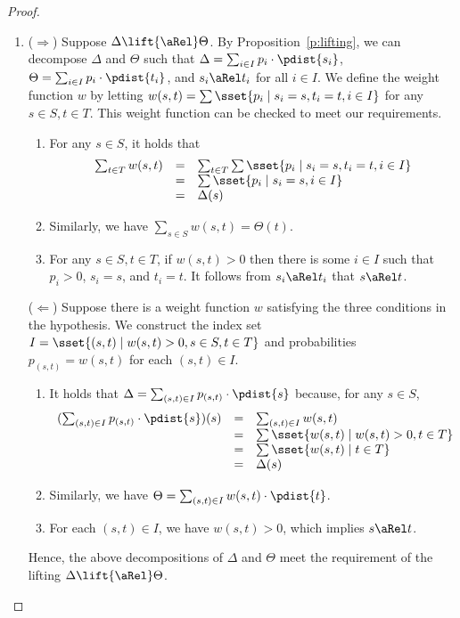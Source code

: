 \documentclass{article}
\begin{document}
\begin{proof}
\begin{enumerate}
\item
($\Rightarrow$) Suppose $\Delta\lift{\aRel}\Theta$. By
Proposition~\ref{p:lifting}, we can decompose $\Delta$ and $\Theta$
such that $\Delta=\sum_{i\in I}p_i\cdot\pdist{s_i}$,
$\Theta=\sum_{i\in I}p_i\cdot\pdist{t_i}$, and $s_i\aRel t_i$ for
all $i\in I$. We define the weight function $w$ by letting
$w(s,t)=\sum\sset{p_i\mid s_i=s, t_i=t, i\in I}$ for any $s\in S,
t\in T$. This weight function can be checked to meet our
requirements.
\begin{enumerate}
\item For any $s\in S$, it holds that
\[\begin{array}{rcl}
\sum_{t\in T}w(s,t) &= & \sum_{t\in T}\sum\sset{p_i\mid s_i=s,
t_i=t, i\in I}\\
& = &\sum\sset{p_i\mid s_i=s, i\in I}\\
& = & \Delta(s)
\end{array}\]
\item Similarly, we have $\sum_{s\in S}w(s,t)=\Theta(t)$.
\item For any $s\in S, t\in T$, if $w(s,t)>0$ then there is some $i\in
I$ such that $p_i>0$, $s_i=s$, and $t_i=t$. It follows from
$s_i\aRel t_i$ that $s\aRel t$.
\end{enumerate}

($\Leftarrow$) Suppose there is a weight function $w$ satisfying the
three conditions in the hypothesis. We construct the index set
$I=\sset{(s,t)\mid w(s,t)>0, s\in S,t\in T}$ and probabilities
$p_{(s,t)}=w(s,t)$ for each $(s,t)\in I$.
\begin{enumerate}
\item It holds that $\Delta=\sum_{(s,t)\in I}p_{(s,t)}\cdot\pdist{s}$
because, for any $s\in S$,
\[\begin{array}{rcl}
(\sum_{(s,t)\in I}p_{(s,t)}\cdot\pdist{s})(s) & = & \sum_{(s,t)\in
I}w(s,t)\\
& = & \sum\sset{w(s,t)\mid w(s,t)>0, t\in T}\\
& = & \sum\sset{w(s,t)\mid t\in T}\\
& = & \Delta(s)
\end{array}\]
\item Similarly, we have $\Theta=\sum_{(s,t)\in
I}w(s,t)\cdot\pdist{t}$.
\item For each $(s,t)\in I$, we have $w(s,t)>0$, which implies $s\aRel
t$.
\end{enumerate}
Hence, the above decompositions of $\Delta$ and $\Theta$ meet the
requirement of the lifting $\Delta\lift{\aRel}\Theta$.


\end{enumerate}
\end{proof}
\end{document}
